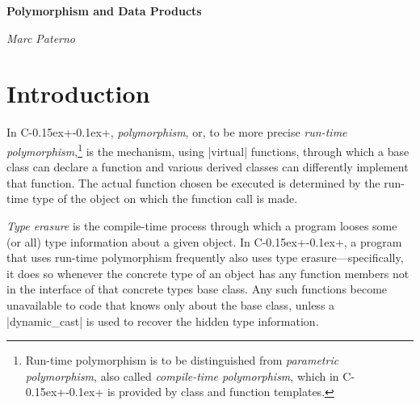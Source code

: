 \documentclass[letterpaper,10pt,article]{memoir}
\newcommand{\longtitle}{Polymorphism and Data Products}
\newcommand{\cpp}{C\kern-0.15ex{+}\kern-0.1ex{+}\xspace} %
\newcommand{\product}[1]{\textbf{#1}\xspace}
\newcommand{\art}{\product{art}}
\begin{document}
\firmlists
	
\thispagestyle{empty}
\begin{flushright}
 {\color{magenta}\Huge\sffamily\bfseries\longtitle}
\end{flushright}
\medspace
\begin{flushright}
  {\itshape Marc Paterno}
\end{flushright}


\begin{abstract}
  This document explains why the \art development team discourages the
  use of base class pointers in data products. It also explains the
  rationale for, and the use of, ``views'', as provided by the \art
  framework.
\end{abstract}

\chapter{Introduction\label{ch:introduction}}

In \cpp, \emph{polymorphism}, or, to be more precise \emph{run-time
  polymorphism},\footnote{Run-time polymorphism is to be distinguished
  from \emph{parametric polymorphism}, also called \emph{compile-time
    polymorphism}, which in \cpp is provided by class and function
  templates.} is the mechanism, using |virtual| functions, through
which a base class can declare a function and various derived classes
can differently implement that function. The actual function chosen be
executed is determined by the run-time type of the object on which the
function call is made.

\emph{Type erasure} is the compile-time process through which a
program looses some (or all) type information about a given object. In
\cpp, a program that uses run-time polymorphism frequently also uses
type erasure---specifically, it does so whenever the concrete type of
an object has any function members not in the interface of that
concrete types base class. Any such functions become unavailable to
code that knows only about the base class, unless a |dynamic_cast| is
used to recover the hidden type information.
\end{document}
